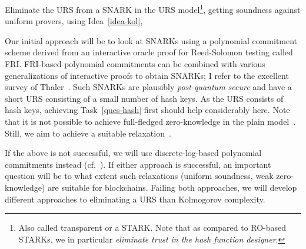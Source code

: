 
\begin{ques}
Eliminate the URS from a SNARK in the URS model\footnote{Also called transparent or a STARK. Note that as compared to RO-based STARKs, we in particular  \emph{eliminate trust in the hash function designer}.}, getting soundness against uniform provers, using Idea~\ref{idea-kol},
\end{ques}  



Our initial approach will be to look at SNARKs using a polynomial commitment scheme derived from an interactive oracle proof for Reed-Solomon testing called FRI.  FRI-based polynomial commitments can be combined with various generalizations of interactive proofs to obtain SNARKs; I refer to the excellent survey of Thaler~\cite{thaler}.
 Such SNARKs are  plausibly \emph{post-quantum secure} and have a short URS consisting of a small number of hash keys.  As the URS consists of hash keys, achieving  Task~\ref{ques-hash} first should help considerably here.  
 Note that it is not possible to achieve full-fledged zero-knowledge in the plain model~\cite{JC:GolOre94}.  Still, we aim to achieve a suitable relaxation~\cite{TCC:BarPas04}. %

   If the above is not successful, we will  use discrete-log-based polynomial commitments instead (cf.~\cite{C:Setty20}).  
  If either approach is successful, an important question will be to what extent such relaxations (uniform soundness, weak zero-knowledge) are suitable for blockchains.
   Failing both approaches, we will develop different approaches to eliminating a URS than Kolmogorov complexity. 
